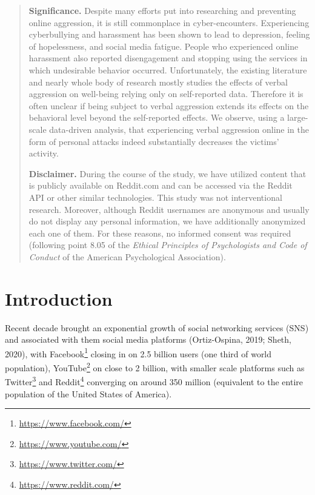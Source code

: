 \documentclass[10pt,dvipsnames]{scrartcl}
\begin{document}
\begin{abstract}
\noindent \textbf{Significance.} Despite many efforts put into researching and preventing online aggression, it is still commonplace in cyber-encounters. Experiencing cyberbullying and harassment has been shown to lead to depression, feeling of hopelessness, and social media fatigue. People who experienced online harassment also reported disengagement and stopping using the services in which undesirable behavior occurred. Unfortunately, the existing literature and nearly whole body of research mostly studies the effects of verbal aggression on well-being relying only on self-reported data. Therefore it is often unclear if being subject to verbal aggression extends its effects on the behavioral level beyond the self-reported effects. We observe,  using a large-scale data-driven analysis, that experiencing verbal aggression online in the form of personal attacks indeed substantially decreases the victims’ activity.

\vspace{2mm}


\noindent \textbf{Disclaimer.} During the course of the study, we have utilized content that is publicly available on \textsf{Reddit.com} and can be accessed via the \textsf{Reddit} API or other similar technologies. This study was not  interventional research. Moreover,  although Reddit usernames are anonymous and usually do not display any personal information, we have additionally anonymized each one of them.  For these reasons, no informed consent was required (following point 8.05 of the \emph{Ethical Principles of Psychologists and Code of Conduct} of the American Psychological Association).
\normalsize

\thispagestyle{empty}

\end{abstract}

\section{Introduction}
\label{intro}

Recent decade brought an exponential growth of social networking
services (SNS) and associated with them social media platforms
(Ortiz-Ospina, 2019; Sheth, 2020), with
Facebook\footnote{\url{https://www.facebook.com/}} closing in on 2.5
billion users (one third of world population),
YouTube\footnote{\url{https://www.youtube.com/}} on close to 2 billion,
with smaller scale platforms such as
Twitter\footnote{\url{https://www.twitter.com/}} and
Reddit\footnote{\url{https://www.reddit.com/}} converging on around 350
million (equivalent to the entire population of the United States of
America).
\end{document}
